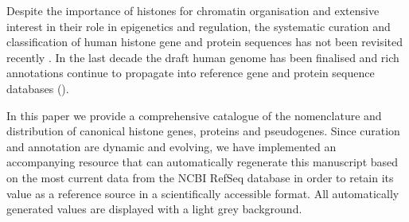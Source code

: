   Despite the importance of histones for chromatin organisation and extensive interest
  in their role in epigenetics and regulation, the systematic curation and classification of human histone
  gene and protein sequences has not been revisited recently \citep{Marzluff02}.
  In the last decade the draft human genome has been finalised 
  and rich annotations continue to propagate into reference gene and protein sequence databases ().


  In this paper we provide a comprehensive catalogue of the nomenclature and distribution 
  of canonical histone genes, proteins and pseudogenes. 
  Since curation and annotation are dynamic and evolving, we have implemented an accompanying resource 
  that can automatically regenerate this manuscript based on the most current data from the NCBI RefSeq database 
  in order to retain its value as a reference source in a scientifically accessible format.
  All automatically generated values are displayed with a light grey background.
